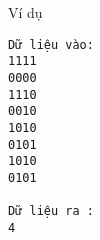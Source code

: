 Ví dụ
\begin{verbatim}
Dữ liệu vào:
1111
0000
1110
0010
1010
0101
1010
0101

Dữ liệu ra :
4
\end{verbatim}